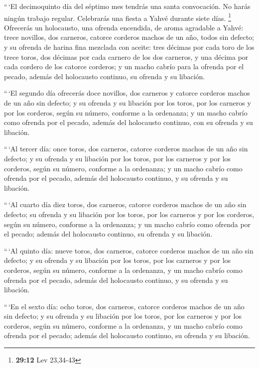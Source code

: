  ``\,`El decimoquinto día del séptimo mes tendrás una
santa convocación. No harás ningún trabajo regular. Celebrarás una
fiesta a Yahvé durante siete días. \footnote{\textbf{29:12} Lev 23,34-43}
 Ofrecerás un holocausto, una ofrenda encendida, de aroma
agradable a Yahvé: trece novillos, dos carneros, catorce corderos machos
de un año, todos sin defecto;  y su ofrenda de harina
fina mezclada con aceite: tres décimas por cada toro de los trece toros,
dos décimas por cada carnero de los dos carneros,  y una
décima por cada cordero de los catorce corderos;  y un
macho cabrío para la ofrenda por el pecado, además del holocausto
continuo, su ofrenda y su libación.

 ``\,`El segundo día ofrecerás doce novillos, dos
carneros y catorce corderos machos de un año sin defecto;
 y su ofrenda y su libación por los toros, por los
carneros y por los corderos, según su número, conforme a la ordenanza;
 y un macho cabrío como ofrenda por el pecado, además del
holocausto continuo, con su ofrenda y su libación.

 ``\,`Al tercer día: once toros, dos carneros, catorce
corderos machos de un año sin defecto;  y su ofrenda y su
libación por los toros, por los carneros y por los corderos, según su
número, conforme a la ordenanza;  y un macho cabrío como
ofrenda por el pecado, además del holocausto continuo, y su ofrenda y su
libación.

 ``\,`Al cuarto día diez toros, dos carneros, catorce
corderos machos de un año sin defecto;  su ofrenda y su
libación por los toros, por los carneros y por los corderos, según su
número, conforme a la ordenanza;  y un macho cabrío como
ofrenda por el pecado; además del holocausto continuo, su ofrenda y su
libación.

 ``\,`Al quinto día: nueve toros, dos carneros, catorce
corderos machos de un año sin defecto;  y su ofrenda y su
libación por los toros, por los carneros y por los corderos, según su
número, conforme a la ordenanza,  y un macho cabrío como
ofrenda por el pecado, además del holocausto continuo, y su ofrenda y su
libación.

 ``\,`En el sexto día: ocho toros, dos carneros, catorce
corderos machos de un año sin defecto;  y su ofrenda y su
libación por los toros, por los carneros y por los corderos, según su
número, conforme a la ordenanza,  y un macho cabrío como
ofrenda por el pecado; además del holocausto continuo, su ofrenda y su
libación.


